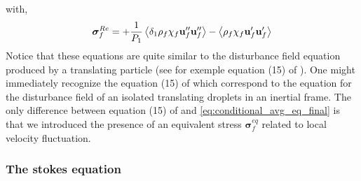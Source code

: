with, 
\begin{equation*}
    \bm\sigma^{Re}_f
    =
    + \frac{1}{P_1}\left<\delta_1\rho_f\chi_f\textbf{u}_f''\textbf{u}_f''\right>
    - \left<\rho_f\chi_f\textbf{u}_f'\textbf{u}_f'\right>
\end{equation*}
Notice that these equations are quite similar to the disturbance field equation produced by a translating particle (see for exemple equation (15) of \citet{maxey1983equation}). 
One might immediately recognize the equation (15) of \citep{maxey1983equation} which correspond to the equation for the disturbance field of an isolated translating droplets in an inertial frame. 
The only difference between equation (15) of \citep{maxey1983equation} and \ref{eq:conditional_avg_eq_final} is that we introduced the presence of an equivalent stress $\bm\sigma_f^{eq}$ related to local velocity fluctuation. 

\subsubsection{The stokes equation}

